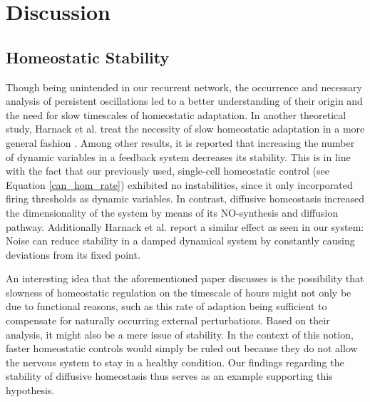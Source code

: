 \documentclass[10pt,a4paper]{article}
\begin{document}
\section{Discussion}

\subsection{Homeostatic Stability}
Though being unintended in our recurrent network, the occurrence and necessary analysis of persistent oscillations led to a better understanding of their origin and the need for slow timescales of homeostatic adaptation. In another theoretical study, Harnack et al. treat the necessity of slow homeostatic adaptation in a more general fashion \cite{Stability_Homeostasis_Harnack_2015}. Among other results, it is reported that increasing the number of dynamic variables in a feedback system decreases its stability. This is in line with the fact that our previously used, single-cell homeostatic control (see Equation \eqref{can_hom_rate}) exhibited no instabilities, since it only incorporated firing thresholds as dynamic variables. In contrast, diffusive homeostasis increased the dimensionality of the system by means of its NO-synthesis and diffusion pathway. Additionally Harnack et al. report a similar effect as seen in our system: Noise can reduce stability in a damped dynamical system by constantly causing deviations from its fixed point.

An interesting idea that the aforementioned paper discusses is the possibility that slowness of homeostatic regulation on the timescale of hours might not only be due to functional reasons, such as this rate of adaption being sufficient to compensate for naturally occurring external perturbations. Based on their analysis, it might also be a mere issue of stability. In the context of this notion, faster homeostatic controls would simply be ruled out because they do not allow the nervous system to stay in a healthy condition. Our findings regarding the stability of diffusive homeostasis thus serves as an example supporting this hypothesis.
\end{document}
